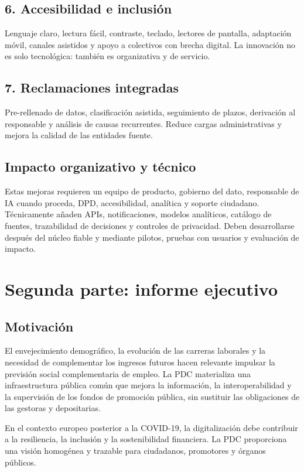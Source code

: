 \documentclass[11pt,a4paper]{article}
\begin{document}
\subsection{6. Accesibilidad e inclusión}
Lenguaje claro, lectura fácil, contraste, teclado, lectores de pantalla, adaptación móvil, canales asistidos y apoyo a colectivos con brecha digital. La innovación no es solo tecnológica: también es organizativa y de servicio.

\subsection{7. Reclamaciones integradas}
Pre-rellenado de datos, clasificación asistida, seguimiento de plazos, derivación al responsable y análisis de causas recurrentes. Reduce cargas administrativas y mejora la calidad de las entidades fuente.

\subsection{Impacto organizativo y técnico}
Estas mejoras requieren un equipo de producto, gobierno del dato, responsable de IA cuando proceda, DPD, accesibilidad, analítica y soporte ciudadano. Técnicamente añaden APIs, notificaciones, modelos analíticos, catálogo de fuentes, trazabilidad de decisiones y controles de privacidad. Deben desarrollarse después del núcleo fiable y mediante pilotos, pruebas con usuarios y evaluación de impacto.

\section{Segunda parte: informe ejecutivo}

\subsection{Motivación}

El envejecimiento demográfico, la evolución de las carreras laborales y la necesidad de complementar los ingresos futuros hacen relevante impulsar la previsión social complementaria de empleo. La PDC materializa una infraestructura pública común que mejora la información, la interoperabilidad y la supervisión de los fondos de promoción pública, sin sustituir las obligaciones de las gestoras y depositarias.

En el contexto europeo posterior a la COVID-19, la digitalización debe contribuir a la resiliencia, la inclusión y la sostenibilidad financiera. La PDC proporciona una visión homogénea y trazable para ciudadanos, promotores y órganos públicos.
\end{document}
